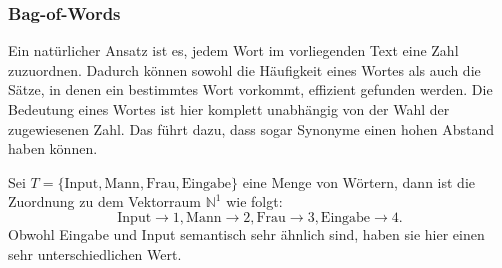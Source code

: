 \documentclass[12pt,letterpaper,ngerman]{article}
\begin{document}
\subsubsection{Bag-of-Words}
Ein natürlicher Ansatz ist es, jedem Wort im vorliegenden Text eine Zahl 
zuzuordnen. Dadurch können sowohl die Häufigkeit eines Wortes als auch
die Sätze, in denen ein bestimmtes Wort vorkommt, effizient gefunden 
werden. Die Bedeutung eines Wortes ist hier komplett unabhängig von 
der Wahl der zugewiesenen Zahl. Das führt dazu, dass sogar Synonyme einen
hohen Abstand haben können.

\begin{example}
  Sei $T = \{\text{Input}, \text{Mann}, \text{Frau},
   \text{Eingabe}\}$ eine Menge von Wörtern, dann ist die Zuordnung
  zu dem Vektorraum $\mathbb{N}^1$ wie folgt:
  \[
    \text{Input} \to 1, 
    \text{Mann} \to 2, 
    \text{Frau} \to 3,
    \text{Eingabe} \to 4.
  \]
  Obwohl Eingabe und Input semantisch sehr ähnlich sind, haben sie hier
  einen sehr unterschiedlichen Wert.
\end{example}
\end{document}
